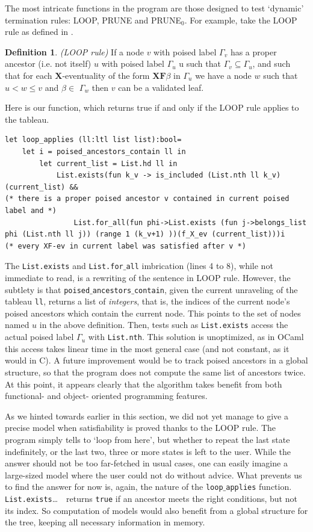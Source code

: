 \documentclass[11pt]{article}
\newcommand{\X}{{\mathbf{X}}}
\newcommand{\F}{{\mathbf{F}}}
\theoremstyle{definition}
\newtheorem*{definition}{Definition}
\begin{document}
The most intricate functions in the program are those designed to test `dynamic'
termination rules: LOOP, PRUNE and PRUNE$_0$. For example, take the LOOP rule as defined in 
\cite{ReyLTL}. 
\begin{definition}
    \emph{(LOOP rule)}
    If a node $v$ with poised label $\Gamma_v$ has a proper ancestor (i.e. not itself) $u$ with
poised label $\Gamma_u$ u such that $\Gamma_v \subseteq \Gamma_u$, and such that for each $\X$-eventuality of the form $\X\F\beta$ in $\Gamma_u$ we
have a node $w$ such that $u < w \leq v $ and $\beta \in$ $\Gamma_w$ then $v$ can be a validated leaf.
\end{definition}
Here is our function, which returns true if and only if the LOOP rule
applies to the tableau.
\begin{lstlisting}
let loop_applies (ll:ltl list list):bool=
    let i = poised_ancestors_contain ll in
        let current_list = List.hd ll in
            List.exists(fun k_v -> is_included (List.nth ll k_v)(current_list) &&
(* there is a proper poised ancestor v contained in current poised label and *)
                List.for_all(fun phi->List.exists (fun j->belongs_list phi (List.nth ll j)) (range 1 (k_v+1) ))(f_X_ev (current_list)))i
(* every XF-ev in current label was satisfied after v *)
\end{lstlisting}

The {\tt List.exists} and {\tt List.for$\_$all} imbrication (lines 4 to 8), while not immediate to read, is a rewriting 
of the sentence in LOOP rule. However, the subtlety is that {\tt poised$\_$ancestors$\_$contain}, given the current unraveling
of the tableau {\tt ll}, returns a list of \emph{integers}, that is, the indices of the current node's poised ancestors
which contain the current node. This points to the set of nodes named $u$ in the above definition. Then, tests such as 
{\tt List.exists} access the actual poised label $\Gamma_u$ with {\tt List.nth}. This solution is unoptimized, as in OCaml 
this access takes linear time in the most general case (and not constant, as it would in C). 
A future improvement would be to track poised ancestors in a global structure,
so that the program does not compute the same list of ancestors twice. At this point, it appears clearly that 
the algorithm takes benefit from both functional- and object- oriented programming features. 

As we hinted towards earlier in this section, 
we did not yet manage to give a precise model when satisfiability is proved thanks to the LOOP rule. The program simply tells 
to `loop from here', but whether to repeat the last state indefinitely, or the last two, three or more
states is left to the user.
While the answer should not be too far-fetched in usual cases, one can easily imagine a large-sized model where 
the user could not do without advice. What prevents us to find the answer for now is, again, the nature 
of the {\tt loop$\_$applies} function. {\tt List.exists}\ldots $\mbox{ }$ returns {\tt true} if an ancestor meets the right conditions,
but not its index. So computation of models would also benefit from a global structure for the tree,
keeping all necessary information
in memory. 
\end{document}
